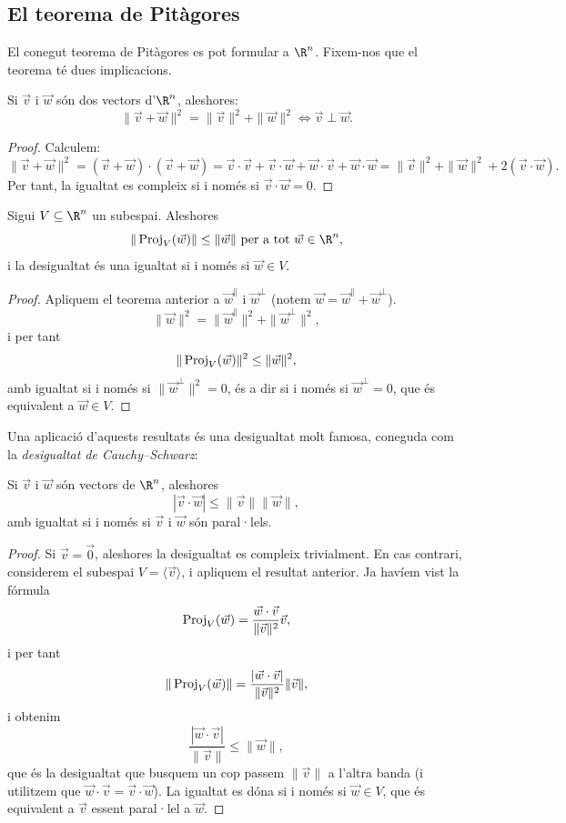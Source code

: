 \subsection{El teorema de Pitàgores}
El conegut teorema de Pitàgores es pot formular a $\R^n$. Fixem-nos que el teorema té dues implicacions.
\begin{teorema}
Si $\vec v$ i $\vec w$ són dos vectors d'$\R^n$, aleshores:
\[
\| \vec v + \vec w \|^2 = \|\vec v\|^2 + \|\vec  w\|^2 \iff \vec v \perp \vec w.
\]
\end{teorema}
\begin{proof}
Calculem:
\[
\| \vec v + \vec w\|^2 = (\vec v+\vec w)\cdot (\vec v+\vec w) = \vec v\cdot \vec v + \vec v\cdot \vec w + \vec w\cdot \vec v + \vec w\cdot \vec w=\|\vec v\|^2 + \|\vec w\|^2 +2(\vec v\cdot \vec w). 
\]
Per tant, la igualtat es compleix si i només si $\vec v\cdot \vec w = 0$.
\end{proof}
\begin{corollari}
Sigui $V\subseteq \R^n$ un subespai. Aleshores
\[
\|\proj_V(\vec w)\| \leq \| \vec w\| \text{ per a tot $\vec w\in\R^n$,}
\]
i la desigualtat és una igualtat si i només si $\vec w\in V$.
\end{corollari}
\begin{proof}
Apliquem el teorema anterior a $\vec w^\parallel$ i $\vec w^\perp$ (notem $\vec w = \vec w^\parallel + \vec w^\perp$).
\[
\|\vec w\|^2 = \|\vec w^\parallel\|^2 + \|\vec w^\perp\|^2,
\]
i per tant
\[
\|\operatorname{Proj}_V(\vec w)\|^2 \leq \|\vec w\|^2,
\]
amb igualtat si i només si $\|\vec w^\perp\|^2 = 0$, és a dir si i només si $\vec w^\perp = 0$, que és equivalent a $\vec w\in V$.
\end{proof}

Una aplicació d'aquests resultats és una desigualtat molt famosa, coneguda com la \emph{desigualtat de Cauchy--Schwarz}:
\begin{teorema}
Si $\vec v$ i $\vec w$ són vectors de $\R^n$, aleshores
\[
|\vec v\cdot \vec w|\leq \|\vec v\|\|\vec w\|,
\]
amb igualtat si i només si $\vec v$ i $\vec w$ són paral·lels.
\end{teorema}
\begin{proof}
Si $\vec v=\vec 0$, aleshores la desigualtat es compleix trivialment. En cas contrari, considerem el subespai $V=\langle \vec v\rangle$, i apliquem el resultat anterior. Ja havíem vist la fórmula
\[
\operatorname{Proj}_V(\vec w) = \frac{\vec w\cdot \vec v}{\|\vec v\|^2} \vec v,
\]
i per tant
\[
\|\operatorname{Proj}_V(\vec w)\| = \frac{|\vec w\cdot \vec v|}{\|\vec v\|^2} \|\vec v\|,
\]
i obtenim
\[
\frac{|\vec w\cdot \vec v|}{\|\vec v\|} \leq \|\vec w\|,
\]
que és la desigualtat que busquem un cop passem $\|\vec v\|$ a l'altra banda (i utilitzem que $\vec w\cdot \vec v=\vec v\cdot \vec w$). La igualtat es dóna si i només si $\vec w\in V$, que és equivalent a $\vec v$ essent paral·lel a $\vec w$.
\end{proof}

